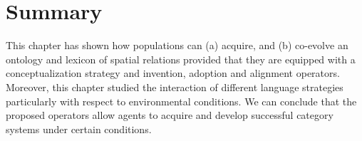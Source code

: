 \section{Summary}
This chapter has shown how populations can (a)
acquire, and (b) co-evolve an ontology and lexicon of spatial relations 
provided that they are equipped with a conceptualization strategy 
and invention, adoption and alignment operators. 
Moreover, this chapter studied the interaction of different language strategies
particularly with respect to environmental conditions. We can conclude that
the proposed operators allow agents to acquire and develop successful category systems
under certain conditions. 

%
%
%